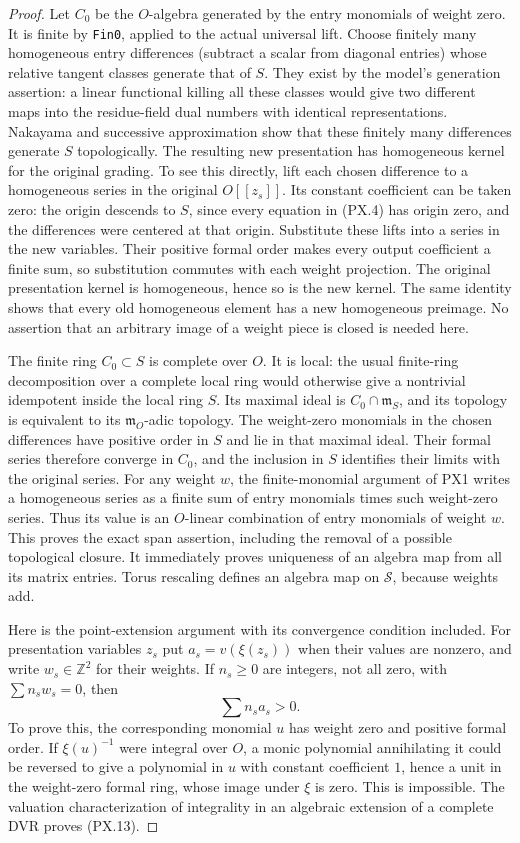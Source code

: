 \begin{proof}
Let $C_0$ be the $O$-algebra generated by the entry
monomials of weight zero.  It is finite by
\texttt{Fin0}, applied to the actual universal lift.
Choose finitely many homogeneous entry differences
(subtract a scalar from diagonal entries) whose
relative tangent classes generate that of $S$.
They exist by the model's generation assertion: a
linear functional killing all these classes would
give two different maps into the residue-field dual
numbers with identical representations.  Nakayama
and successive approximation show that these finitely
many differences generate $S$ topologically.
The resulting new presentation has homogeneous kernel
for the original grading.  To see this directly, lift
each chosen difference to a homogeneous series in the
original $O[[z_s]]$.  Its constant coefficient can be
taken zero: the origin descends to $S$, since every
equation in (PX.4) has origin zero, and the differences
were centered at that origin.  Substitute these lifts
into a series in the new variables.  Their positive
formal order makes every output coefficient a finite
sum, so substitution commutes with each weight
projection.  The original presentation kernel is
homogeneous, hence so is the new kernel.  The same
identity shows that every old homogeneous element
has a new homogeneous preimage.  No assertion that
an arbitrary image of a weight piece is closed is
needed here.

The finite ring $C_0\subset S$ is complete over $O$.
It is local: the usual finite-ring decomposition over
a complete local ring would otherwise give a nontrivial
idempotent inside the local ring $S$.  Its maximal
ideal is $C_0\cap\mathfrak m_S$, and its topology is
equivalent to its $\mathfrak m_O$-adic topology.
The weight-zero monomials in the chosen differences
have positive order in $S$ and lie in that maximal
ideal.  Their formal series therefore converge in
$C_0$, and the inclusion in $S$ identifies their
limits with the original series.  For any weight $w$,
the finite-monomial argument of PX1 writes a
homogeneous series as a finite sum of entry monomials
times such weight-zero series.  Thus its value is
an $O$-linear combination of entry monomials of
weight $w$.  This proves the exact span assertion,
including the removal of a possible topological
closure.  It immediately proves uniqueness of an
algebra map from all its matrix entries.  Torus
rescaling defines an algebra map on $\mathcal S$,
because weights add.

Here is the point-extension argument with its
convergence condition included.  For presentation
variables $z_s$ put $a_s=v(\xi(z_s))$ when their
values are nonzero, and write $w_s\in\mathbb Z^2$
for their weights.  If $n_s\ge0$ are integers, not
all zero, with $\sum n_sw_s=0$, then
\[
                   \sum n_sa_s>0.
 \tag{PX.13}
\]
To prove this, the corresponding monomial $u$ has
weight zero and positive formal order.  If
$\xi(u)^{-1}$ were integral over $O$, a monic
polynomial annihilating it could be reversed to
give a polynomial in $u$ with constant coefficient
$1$, hence a unit in the weight-zero formal ring,
whose image under $\xi$ is zero.  This is impossible.
The valuation characterization of integrality in
an algebraic extension of a complete DVR proves
(PX.13).


\end{proof}
